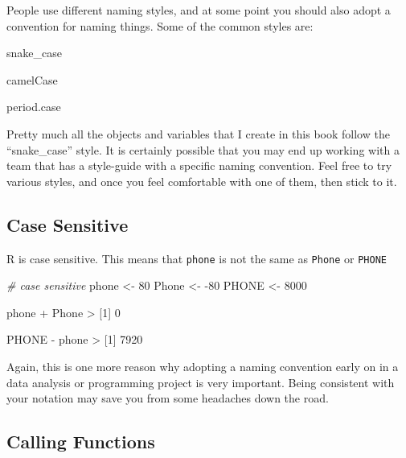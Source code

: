 \documentclass[
]{book}
\newenvironment{Shaded}{\begin{snugshade}}{\end{snugshade}}
\newcommand{\CommentTok}[1]{\textcolor[rgb]{0.56,0.35,0.01}{\textit{#1}}}
\newcommand{\DecValTok}[1]{\textcolor[rgb]{0.00,0.00,0.81}{#1}}
\newcommand{\NormalTok}[1]{#1}
\newcommand{\OtherTok}[1]{\textcolor[rgb]{0.56,0.35,0.01}{#1}}
\newcommand{\SpecialCharTok}[1]{\textcolor[rgb]{0.00,0.00,0.00}{#1}}
\begin{document}
People use different naming styles, and at some point you should also adopt a
convention for naming things. Some of the common styles are:

\begin{Shaded}
\begin{Highlighting}[]
\NormalTok{snake\_case}

\NormalTok{camelCase}

\NormalTok{period.case}
\end{Highlighting}
\end{Shaded}

Pretty much all the objects and variables that I create in this book follow the
``snake\_case'' style. It is certainly possible that you may end up working with
a team that has a style-guide with a specific naming convention. Feel free to try
various styles, and once you feel comfortable with one of them, then stick to it.

\hypertarget{case-sensitive}{%
\subsection{Case Sensitive}\label{case-sensitive}}

R is case sensitive. This means that \texttt{phone} is not the same as \texttt{Phone} or
\texttt{PHONE}

\begin{Shaded}
\begin{Highlighting}[]
\CommentTok{\# case sensitive}
\NormalTok{phone }\OtherTok{\textless{}{-}} \DecValTok{80}
\NormalTok{Phone }\OtherTok{\textless{}{-}} \SpecialCharTok{{-}}\DecValTok{80}
\NormalTok{PHONE }\OtherTok{\textless{}{-}} \DecValTok{8000}

\NormalTok{phone }\SpecialCharTok{+}\NormalTok{ Phone}
\SpecialCharTok{\textgreater{}}\NormalTok{ [}\DecValTok{1}\NormalTok{] }\DecValTok{0}

\NormalTok{PHONE }\SpecialCharTok{{-}}\NormalTok{ phone}
\SpecialCharTok{\textgreater{}}\NormalTok{ [}\DecValTok{1}\NormalTok{] }\DecValTok{7920}
\end{Highlighting}
\end{Shaded}

Again, this is one more reason why adopting a naming convention early on in
a data analysis or programming project is very important. Being consistent with
your notation may save you from some headaches down the road.

\hypertarget{calling-functions}{%
\subsection{Calling Functions}\label{calling-functions}}
\end{document}

